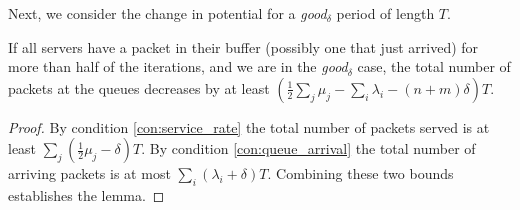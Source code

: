 Next, we consider the change in potential for a \emph{good$_\delta$} period of length $T$.

\begin{lemma}
\label{lm:full_server}
  If all servers have a packet in their buffer (possibly one that just arrived) for more than half of the iterations, and we are in the \emph{good$_\delta$} case, the total number of packets at the queues decreases by at least  $(\frac12 \sum_j \mu_j-\sum_i\lambda_i -(n+m)\delta) T$.

\end{lemma}

\begin{proof}
By condition \ref{con:service_rate} the total number of packets served is at least $\sum_j (\frac12\mu_j -\delta)T$. By condition \ref{con:queue_arrival} the total number of arriving packets is at most $\sum_i (\lambda_i+\delta)T$. Combining these two bounds establishes the lemma. 
\end{proof}


